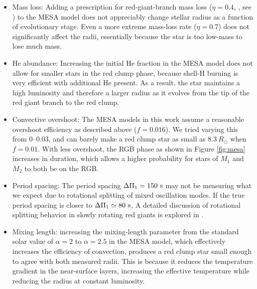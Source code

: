 \begin{itemize}
\item Mass loss: Adding a prescription for red-giant-branch mass loss ($\eta = 0.4$, , see \citealt{mig12}) to the MESA model does not appreciably change stellar radius as a function of evolutionary stage. Even a more extreme mass-loss rate ($\eta = 0.7$) does not significantly affect the radii, essentially because the star is too low-mass to lose much mass.
\item He abundance: Increasing the initial He fraction in the MESA model does not allow for smaller stars in the red clump phase, because shell-H burning is very efficient with additional He present. As a result, the star maintains a high luminosity and therefore a larger radius as it evolves from the tip of the red giant branch to the red clump.
\item Convective overshoot: The MESA models in this work assume a reasonable overshoot efficiency as described above ($f = 0.016$). We tried varying this from 0--0.03, and can barely make a red clump star as small as $8.3 \ R_\odot$ when $f = 0.01$. With less overshoot, the RGB phase as shown in Figure \ref{fig:mesa} increases in duration, which allows a higher probability for stars of $M_1$ and $M_2$ to both be on the RGB.
\item Period spacing: The period spacing $\Delta \Pi_1 = 150 \ \rm{s}$ may not be measuring what we expect due to rotational splitting of mixed oscillation modes. If the true period spacing is closer to $\Delta \Pi_1 \simeq 80 \ \rm{s}$,  A detailed discussion of rotational splitting behavior in slowly rotating red giants is explored in \citet{gou13}.
\item Mixing length:  increasing the mixing-length parameter from the standard solar value of $\alpha = 2$ to $\alpha = 2.5$ in the MESA model, which effectively increases the efficiency of convection, produces a red clump star small enough to agree with both measured radii. This is because it reduces the temperature gradient in the near-surface layers, increasing the effective temperature while reducing the radius at constant luminosity. 
\end{itemize}
